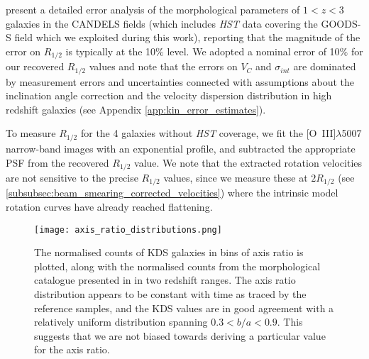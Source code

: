 \documentclass[fleqn,usenatbib]{mnras}
\begin{document}
\noindent
\cite{Bruce2012} present a detailed error analysis of the morphological parameters of $1 < z < 3$ galaxies in the CANDELS fields (which includes {\em HST} data covering the GOODS-S field which we exploited during this work), reporting that the magnitude of the error on $R_{1/2}$ is typically at the 10$\%$ level.
We adopted a nominal error of 10$\%$ for our recovered $R_{1/2}$ values and note that the errors on $V_{C}$ and $\sigma_{int}$ are dominated by measurement errors and uncertainties connected with assumptions about the inclination angle correction and the velocity dispersion distribution in high redshift galaxies (see Appendix \ref{app:kin_error_estimates}).

\noindent
To measure $R_{1/2}$ for the 4 galaxies without {\em HST} coverage, we fit the [O~{\sc III}]$\lambda$5007 narrow-band images with an exponential profile, and subtracted the appropriate PSF from the recovered $R_{1/2}$ value.
We note that the extracted rotation velocities are not sensitive to the precise $R_{1/2}$ values, since we measure these at $2R_{1/2}$ (see \cref{subsubsec:beam_smearing_corrected_velocities}) where the intrinsic model rotation curves have already reached flattening.

\begin{figure}
\centering \hspace{-1.13cm}
\texttt{[image: axis\_ratio\_distributions.png]}
\caption{The normalised counts of KDS galaxies in bins of axis ratio is plotted, along with the normalised counts from the morphological catalogue presented in \protect\cite{VanderWel2012} in two redshift ranges.
The axis ratio distribution appears to be constant with time as traced by the reference samples, and the KDS values are in good agreement with a relatively uniform distribution spanning $0.3 < b/a < 0.9$.
This suggests that we are not biased towards deriving a particular value for the axis ratio.}
\label{fig:morpho-distributions}
\end{figure}
\end{document}
